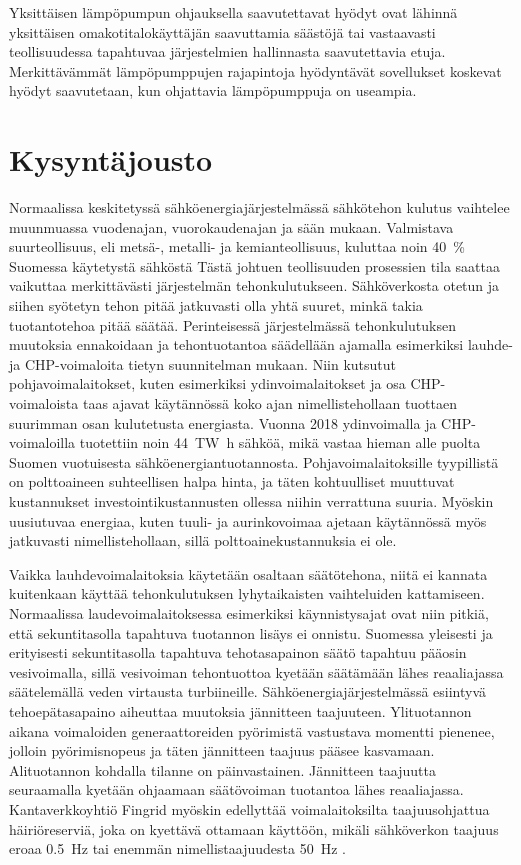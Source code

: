   Yksittäisen lämpöpumpun ohjauksella saavutettavat hyödyt ovat lähinnä yksittäisen omakotitalokäyttäjän saavuttamia säästöjä tai vastaavasti teollisuudessa tapahtuvaa järjestelmien hallinnasta saavutettavia etuja. Merkittävämmät lämpöpumppujen rajapintoja hyödyntävät sovellukset koskevat hyödyt saavutetaan, kun ohjattavia lämpöpumppuja on useampia.

\section{Kysyntäjousto}

  Normaalissa keskitetyssä sähköenergiajärjestelmässä sähkötehon kulutus vaihtelee muunmuassa vuodenajan, vuorokaudenajan ja sään mukaan. Valmistava suurteollisuus, eli metsä-, metalli- ja kemianteollisuus, kuluttaa noin \SI{40}{\percent} Suomessa käytetystä sähköstä Tästä johtuen teollisuuden prosessien tila saattaa vaikuttaa merkittävästi järjestelmän tehonkulutukseen\parencite{SVTehk}. Sähköverkosta otetun ja siihen syötetyn tehon pitää jatkuvasti olla yhtä suuret, minkä takia tuotantotehoa pitää säätää. Perinteisessä järjestelmässä tehonkulutuksen muutoksia ennakoidaan ja tehontuotantoa säädellään ajamalla esimerkiksi lauhde- ja \gls{CHP}-voimaloita tietyn suunnitelman mukaan.\parencite{energiateollisuus} Niin kutsutut pohjavoimalaitokset, kuten esimerkiksi ydinvoimalaitokset ja osa \gls{CHP}-voimaloista taas ajavat käytännössä koko ajan nimellistehollaan tuottaen suurimman osan kulutetusta energiasta. Vuonna 2018 ydinvoimalla ja CHP-voimaloilla tuotettiin noin \SI{44}{\tera\watt\hour} sähköä, mikä vastaa hieman alle puolta Suomen vuotuisesta sähköenergiantuotannosta.\parencite{SVTSaLaTuo} Pohjavoimalaitoksille tyypillistä on polttoaineen suhteellisen halpa hinta, ja täten kohtuulliset muuttuvat kustannukset investointikustannusten ollessa niihin verrattuna suuria. Myöskin uusiutuvaa energiaa, kuten tuuli- ja aurinkovoimaa ajetaan käytännössä myös jatkuvasti nimellistehollaan, sillä polttoainekustannuksia ei ole.

  Vaikka lauhdevoimalaitoksia käytetään osaltaan säätötehona, niitä ei kannata kuitenkaan käyttää tehonkulutuksen lyhytaikaisten vaihteluiden kattamiseen. Normaalissa laudevoimalaitoksessa esimerkiksi käynnistysajat ovat niin pitkiä, että sekuntitasolla tapahtuva tuotannon lisäys ei onnistu.\parencite{VJV2018} Suomessa yleisesti ja erityisesti sekuntitasolla tapahtuva tehotasapainon säätö tapahtuu pääosin vesivoimalla\parencite{energiateollisuus}, sillä vesivoiman tehontuottoa kyetään säätämään lähes reaaliajassa säätelemällä veden virtausta turbiineille. Sähköenergiajärjestelmässä esiintyvä tehoepätasapaino aiheuttaa muutoksia jännitteen taajuuteen. Ylituotannon aikana voimaloiden generaattoreiden pyörimistä vastustava momentti pienenee, jolloin pyörimisnopeus ja täten jännitteen taajuus pääsee kasvamaan. Alituotannon kohdalla tilanne on päinvastainen. Jännitteen taajuutta seuraamalla kyetään ohjaamaan säätövoiman tuotantoa lähes reaaliajassa. Kantaverkkoyhtiö Fingrid myöskin edellyttää voimalaitoksilta taajuusohjattua häiriöreserviä, joka on kyettävä ottamaan käyttöön, mikäli sähköverkon taajuus eroaa \SI{0.5}{\hertz} tai enemmän nimellistaajuudesta \SI{50}{\hertz} \parencite{VJV2018}.


